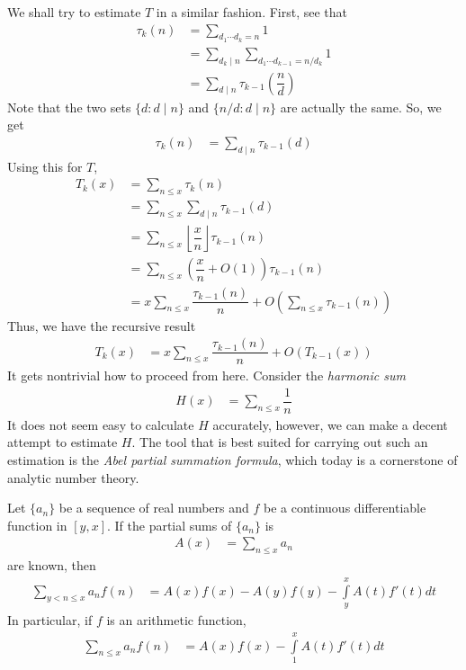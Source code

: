 \documentclass[elemannt.tex]{subfile}
\begin{document}
	We shall try to estimate $T$ in a similar fashion. First, see that
		\begin{align*}
			\tau_{k}(n)
				& = \sum_{d_{1}\cdots d_{k}=n}1\\
				& = \sum_{d_{k}\mid n}\sum_{d_{1}\cdots d_{k-1}=n/d_{k}}1\\
				& = \sum_{d\mid n}\tau_{k-1}\left(\dfrac{n}{d}\right)
		\end{align*}
	Note that the two sets $\{d:d\mid n\}$ and $\{n/d:d\mid n\}$ are actually the same. So, we get
		\begin{align*}
			\tau_{k}(n)
				& = \sum_{d\mid n}\tau_{k-1}(d)
		\end{align*}
	Using this for $T$,
		\begin{align*}
			T_{k}(x)
				& = \sum_{n\leq x}\tau_{k}(n)\\
				& = \sum_{n\leq x}\sum_{d\mid n}\tau_{k-1}(d)\\
				& = \sum_{n\leq x}\left\lfloor{\dfrac{x}{n}}\right\rfloor\tau_{k-1}(n)\\
				& = \sum_{n\leq x}\left(\dfrac{x}{n}+O(1)\right)\tau_{k-1}(n)\\
				& = x\sum_{n\leq x}\dfrac{\tau_{k-1}(n)}{n}+O\left(\sum_{n\leq x}\tau_{k-1}(n)\right)
		\end{align*}
	Thus, we have the recursive result
		\begin{align*}
			T_{k}(x)
				& = x\sum_{n\leq x}\dfrac{\tau_{k-1}(n)}{n}+O(T_{k-1}(x))
		\end{align*}
	It gets nontrivial how to proceed from here. Consider the \textit{harmonic sum}
		\begin{align*}
			H(x)
			& = \sum_{n\leq x}\dfrac{1}{n}
		\end{align*}
	It does not seem easy to calculate $H$ accurately, however, we can make a decent attempt to estimate $H$. The tool that is best suited for carrying out such an estimation is the \textit{Abel partial summation formula}, which today is a cornerstone of analytic number theory.
		\begin{theorem}\label{thm:abel}
			Let $\{a_{n}\}$ be a sequence of real numbers and $f$ be a continuous differentiable function in $[y,x]$. If the partial sums of $\{a_{n}\}$ is
				\begin{align*}
					A(x)
						& = \sum_{n\leq x}a_{n}
				\end{align*}
			are known, then
				\begin{align*}
					\sum_{y<n\leq x}a_{n}f(n)
						& = A(x)f(x)-A(y)f(y)-\int\limits_{y}^{x}A(t)f'(t)dt
				\end{align*}
			In particular, if $f$ is an arithmetic function,
				\begin{align*}
					\sum_{n\leq x}a_{n}f(n)
						& = A(x)f(x)-\int\limits_{1}^{x}A(t)f'(t)dt
				\end{align*}
		\end{theorem}
		
\end{document}
